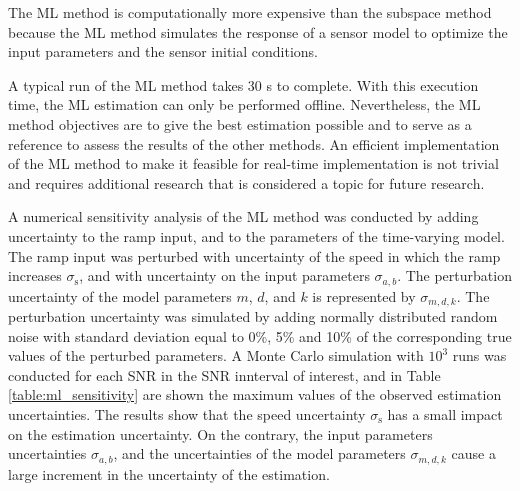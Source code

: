 The ML method is  computationally more expensive than the subspace method because the ML method simulates the response of a sensor model to optimize the input parameters and the sensor initial conditions.

A typical run of the ML method takes 30 s to complete.
With this execution time, the ML estimation can only be performed offline.
Nevertheless, the ML method objectives are to give the best estimation possible and to serve as a reference to assess the results of the other methods.
An efficient implementation of the ML method to make it feasible for real-time implementation is not trivial and requires additional research that is considered a topic for future research.

A numerical sensitivity analysis of the ML method was conducted by adding uncertainty to the ramp input, and to the parameters of the time-varying model. 
The ramp input was perturbed with uncertainty of the speed in which the ramp increases $\sigma_{\mathrm{s}}$, and with uncertainty on the input parameters $\sigma_{a,b}$. 
The perturbation uncertainty of the model parameters $m$, $d$, and $k$ is represented by $\sigma_{m,d,k}$. 
The perturbation uncertainty was simulated by adding normally distributed random noise with standard deviation equal to 0\%, 5\% and 10\% of the corresponding true values of the perturbed parameters.
A Monte Carlo simulation with $10^3$ runs was conducted for each SNR in the SNR innterval of interest, and in Table \ref{table:ml_sensitivity} are shown the maximum values of the observed estimation uncertainties. 
The results show that the speed uncertainty $\sigma_{\mathrm{s}}$ has a small impact on the estimation uncertainty.
On the contrary, the input parameters uncertainties $\sigma_{a,b}$, and the uncertainties of the model parameters $\sigma_{m,d,k}$ cause a large increment in the uncertainty of the estimation.

